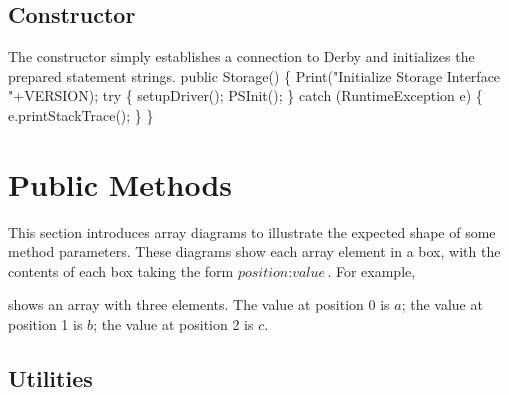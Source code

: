 \documentclass{article}
\def\nwendcode{\endtrivlist \endgroup}      %
\let\nwdocspar=\par
\theoremstyle{definition}                   %
\begin{document}
\subsection{Constructor}
\label{sec:constructor}
The constructor simply establishes a connection to Derby and initializes the
prepared statement strings.
\nwenddocs{}\endmoddef{}
public Storage() \{
  Print("Initialize Storage Interface "+VERSION);
  try \{
    setupDriver();
    PSInit();
  \} catch (RuntimeException e) \{
    e.printStackTrace();
  \}
\}
\nwendcode{}\nwdocspar

\section{Public Methods}
\label{sec:public-methods}
This section introduces array diagrams to illustrate the expected shape of some
method parameters. These diagrams show each array element in a box, with the
contents of each box taking the form $\textit{position}:\textit{value}$. For
example,


\noindent shows an array with three elements. The value at position 0 is $a$; the
value at position 1 is $b$; the value at position 2 is $c$.

\subsection{Utilities}
\label{sec:utilities}
\end{document}
